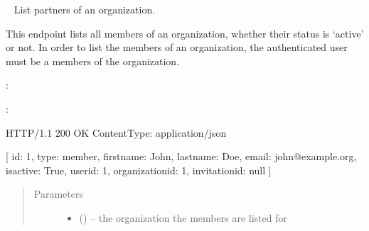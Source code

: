 \documentclass[letterpaper,10pt,english]{sphinxmanual}
\begin{document}
\begin{DUlineblock}{0em}
\item[] 
\end{DUlineblock}


\begin{fulllineitems}
\label{\detokenize{resources/organization:get--organizations-(organization_id)-members}}~
List partners of an organization.

This endpoint lists all members of an organization, whether their
status is `active' or not. In order to list the members of an
organization, the authenticated user must be a members of the
organization.

:

\begin{sphinxVerbatim}[commandchars=\\\{\}]
  
 
 
\end{sphinxVerbatim}

:

\begin{sphinxVerbatim}[commandchars=\\\{\}]
HTTP/1.1 200 OK
Content\PYGZhy{}Type: application/json

[
    \PYGZob{}
        \PYGZsq{}id\PYGZsq{}: 1,
        \PYGZsq{}type\PYGZsq{}: \PYGZsq{}member\PYGZsq{},
        \PYGZsq{}firstname\PYGZsq{}: \PYGZsq{}John\PYGZsq{},
        \PYGZsq{}lastname\PYGZsq{}: \PYGZsq{}Doe\PYGZsq{},
        \PYGZsq{}email\PYGZsq{}: \PYGZsq{}john@example.org\PYGZsq{},
        \PYGZsq{}is\PYGZus{}active\PYGZsq{}: True,
        \PYGZsq{}user\PYGZus{}id\PYGZsq{}: 1,
        \PYGZsq{}organization\PYGZus{}id\PYGZsq{}: 1,
        \PYGZsq{}invitation\PYGZus{}id\PYGZsq{}: null
    \PYGZcb{}
]
\end{sphinxVerbatim}
\begin{quote}\begin{description}
\item[{Parameters}] \leavevmode\begin{itemize}
\item {} 
 () -- the organization the members are listed
for


\end{itemize}
\end{description}
\end{quote}
\end{fulllineitems}
\end{document}
